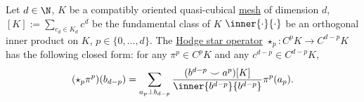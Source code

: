 \begin{proposition}
  Let
    $d \in \N$,
    $K$ be a compatibly oriented quasi-cubical
    \hyperref[idec:mesh:definition]{mesh} of dimension $d$,
    $[K] := \sum_{c_d \in K_d} c^d$ be the fundamental class of $K$
    $\inner{\cdot}{\cdot}$ be an orthogonal inner product on $K$,
    $p \in \{0, ..., d\}$.
  The \hyperref[idec/mesh/quasi_cubical/hodge_star/concept-definition]
               {Hodge star operator}
  $\star_p \colon C^p K \to C^{d - p} K$ has the following closed form:
  for any $\pi^p \in C^p K$ and any $c^{d - p} \in C^{d - p} K$,
  \begin{equation}
    (\star_p \pi^p)(b_{d - p})
    = \sum_{a_p \perp b_{d - p}}
        \frac{(b^{d - p} \smile a^p)[K]}{\inner{b^{d - p}}{b^{d - p}}}
        \pi^p(a_p).
  \end{equation}
\end{proposition}
